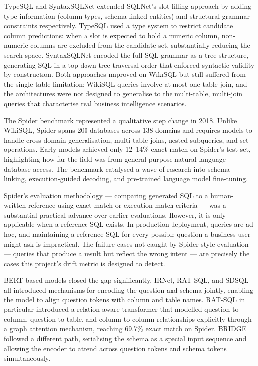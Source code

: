 \documentclass[12pt,a4paper]{report}
\begin{document}
TypeSQL and SyntaxSQLNet extended SQLNet's slot-filling approach by adding type information (column types, schema-linked entities) and structural grammar constraints respectively. TypeSQL used a type system to restrict candidate column predictions: when a slot is expected to hold a numeric column, non-numeric columns are excluded from the candidate set, substantially reducing the search space. SyntaxSQLNet encoded the full SQL grammar as a tree structure, generating SQL in a top-down tree traversal order that enforced syntactic validity by construction. Both approaches improved on WikiSQL but still suffered from the single-table limitation: WikiSQL queries involve at most one table join, and the architectures were not designed to generalise to the multi-table, multi-join queries that characterise real business intelligence scenarios.

The Spider benchmark \cite{spider} represented a qualitative step change in 2018. Unlike WikiSQL, Spider spans 200 databases across 138 domains and requires models to handle cross-domain generalisation, multi-table joins, nested subqueries, and set operations. Early models achieved only 12–14\% exact match on Spider's test set, highlighting how far the field was from general-purpose natural language database access. The benchmark catalysed a wave of research into schema linking, execution-guided decoding, and pre-trained language model fine-tuning.

Spider's evaluation methodology — comparing generated SQL to a human-written reference using exact-match or execution-match criteria — was a substantial practical advance over earlier evaluations. However, it is only applicable when a reference SQL exists. In production deployment, queries are ad hoc, and maintaining a reference SQL for every possible question a business user might ask is impractical. The failure cases not caught by Spider-style evaluation — queries that produce a result but reflect the wrong intent — are precisely the cases this project's drift metric is designed to detect.

\ac{BERT}-based models \cite{spider} closed the gap significantly. IRNet, RAT-SQL, and SDSQL all introduced mechanisms for encoding the question and schema jointly, enabling the model to align question tokens with column and table names. RAT-SQL in particular introduced a relation-aware transformer that modelled question-to-column, question-to-table, and column-to-column relationships explicitly through a graph attention mechanism, reaching 69.7\% exact match on Spider. BRIDGE followed a different path, serialising the schema as a special input sequence and allowing the encoder to attend across question tokens and schema tokens simultaneously.
\end{document}
